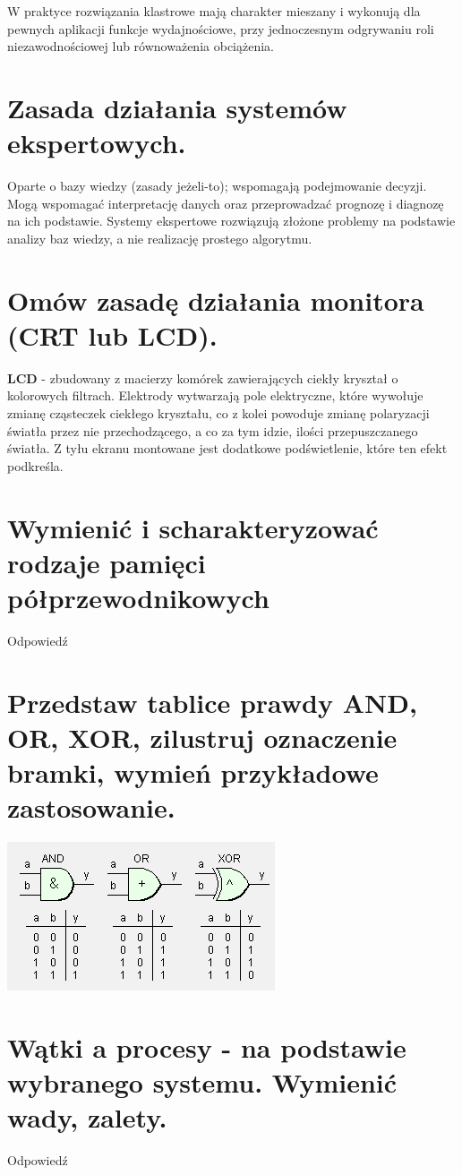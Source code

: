 \documentclass[12pt,a4paper]{article}
\begin{document}
	W praktyce rozwiązania klastrowe mają charakter mieszany i wykonują dla pewnych aplikacji funkcje wydajnościowe, przy jednoczesnym odgrywaniu roli niezawodnościowej lub równoważenia obciążenia.

	\section{Zasada działania systemów ekspertowych.}
	Oparte o bazy wiedzy (zasady jeżeli-to); wspomagają podejmowanie decyzji. Mogą wspomagać interpretację danych oraz przeprowadzać prognozę i diagnozę na ich podstawie.
	Systemy ekspertowe rozwiązują złożone problemy na podstawie analizy baz wiedzy, a nie realizację prostego algorytmu.


	\section{Omów zasadę działania monitora (CRT lub LCD).}
	\textbf{LCD} - zbudowany z macierzy komórek zawierających ciekły kryształ o kolorowych filtrach. Elektrody wytwarzają pole elektryczne, które wywołuje zmianę cząsteczek ciekłego kryształu, co z kolei powoduje zmianę polaryzacji światła przez nie przechodzącego, a co za tym idzie, ilości przepuszczanego światła. Z tyłu ekranu montowane jest dodatkowe podświetlenie, które ten efekt podkreśla.

	\section{Wymienić i scharakteryzować rodzaje pamięci półprzewodnikowych}
	Odpowiedź

	\section{Przedstaw tablice prawdy AND, OR, XOR, zilustruj oznaczenie bramki, wymień przykładowe zastosowanie.}
	\begin{center}
		\includegraphics[width=0.3\linewidth]{images/bramki}
	\end{center}
	

	\section{Wątki a procesy - na podstawie wybranego systemu. Wymienić wady, zalety.}
	Odpowiedź
\end{document}
